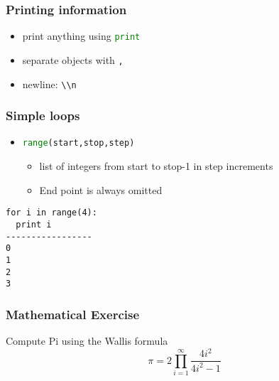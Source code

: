\documentclass[xcolor=table,10pt,final]{beamer}
\begin{document}
\begin{frame}
  \frametitle{Printing information}
  \begin{itemize}
    \item print anything using \lstinline[language=python]|print|
    \item separate objects with \lstinline[language=python]|,|
    \item newline: \lstinline[language=python]|\\n|
  \end{itemize}
\end{frame}

\begin{frame}[fragile]
  \frametitle{Simple loops}
  \begin{itemize}
    \item \lstinline[language=python]|range(start,stop,step)|
      \begin{itemize}
        \item list of integers from start to stop-1 in step increments
        \item End point is always omitted
      \end{itemize}
  \end{itemize}
\begin{lstlisting}
for i in range(4):
  print i
-----------------
0
1
2
3
\end{lstlisting}
\end{frame}

\begin{frame}
  \frametitle{Mathematical Exercise}
  Compute Pi using the Wallis formula
  \vskip1cm
  \begin{equation*}
    \pi = 2\prod^{\infty}_{i=1}\frac{4i^2}{4i^2-1}
  \end{equation*}
\end{frame}
\end{document}
